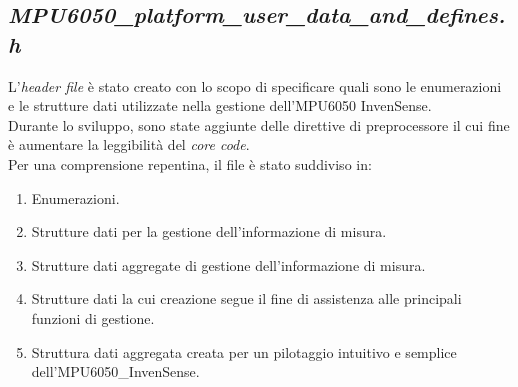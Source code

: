 \subsection{\textit{MPU6050\_platform\_user\_data\_and\_defines.h}}
L'\textit{header file} è stato creato con lo scopo di specificare quali sono le enumerazioni e le strutture dati utilizzate nella gestione dell'MPU6050 InvenSense.\\
Durante lo sviluppo, sono state aggiunte delle direttive di preprocessore il cui fine è aumentare la leggibilità del \textit{core code}.\\
Per una comprensione repentina, il file è stato suddiviso in:
\begin{enumerate}
    \item Enumerazioni.
    \item Strutture dati per la gestione dell'informazione di misura.
    \item Strutture dati aggregate di gestione dell'informazione di misura.
    \item Strutture dati la cui creazione segue il fine di assistenza alle principali funzioni di gestione.
    \item Struttura dati aggregata creata per un pilotaggio intuitivo e semplice\\dell'MPU6050\_InvenSense.
\end{enumerate}

